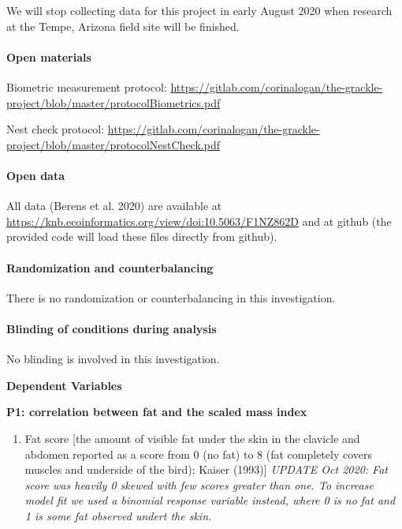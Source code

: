 \documentclass[
]{article}
\providecommand{\tightlist}{%
  \setlength{\itemsep}{0pt}\setlength{\parskip}{0pt}}
\begin{document}
We will stop collecting data for this project in early August 2020 when
research at the Tempe, Arizona field site will be finished.

\hypertarget{open-materials}{%
\paragraph{\texorpdfstring{\textbf{Open
materials}}{Open materials}}\label{open-materials}}

Biometric measurement protocol:
\url{https://gitlab.com/corinalogan/the-grackle-project/blob/master/protocolBiometrics.pdf}

Nest check protocol:
\url{https://gitlab.com/corinalogan/the-grackle-project/blob/master/protocolNestCheck.pdf}

\hypertarget{open-data}{%
\paragraph{\texorpdfstring{\textbf{Open
data}}{Open data}}\label{open-data}}

All data (Berens et al. 2020) are available at
\url{https://knb.ecoinformatics.org/view/doi:10.5063/F1NZ862D} and at
github (the provided code will load these files directly from github).

\hypertarget{randomization-and-counterbalancing}{%
\paragraph{\texorpdfstring{\textbf{Randomization and
counterbalancing}}{Randomization and counterbalancing}}\label{randomization-and-counterbalancing}}

There is no randomization or counterbalancing in this investigation.

\hypertarget{blinding-of-conditions-during-analysis}{%
\paragraph{\texorpdfstring{\textbf{Blinding of conditions during
analysis}}{Blinding of conditions during analysis}}\label{blinding-of-conditions-during-analysis}}

No blinding is involved in this investigation.

\textbf{Dependent Variables}

\textbf{P1: correlation between fat and the scaled mass index}

\begin{enumerate}
\def\labelenumi{\arabic{enumi})}
\tightlist
\item
  Fat score {[}the amount of visible fat under the skin in the clavicle
  and abdomen reported as a score from 0 (no fat) to 8 (fat completely
  covers muscles and underside of the bird); Kaiser (1993){]}
  \emph{UPDATE Oct 2020: Fat score was heavily 0 skewed with few scores
  greater than one. To increase model fit we used a binomial response
  variable instead, where 0 is no fat and 1 is some fat observed undert
  the skin.}
\end{enumerate}
\end{document}
